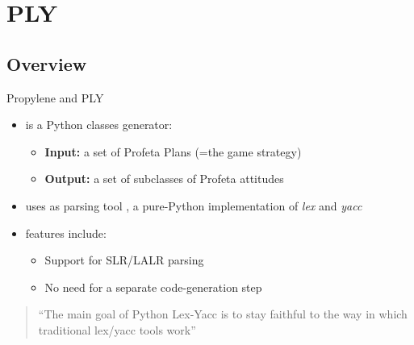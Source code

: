 \section{PLY}

\subsection{Overview}
\begin{frame}{Propylene and PLY}  
  \begin{itemize}
    \item {} is a Python classes generator:
\n
    \begin{itemize}
      \item \textbf{Input:} a set of Profeta Plans (=the game strategy)
\n  
      \item \textbf{Output:} a set of subclasses of Profeta attitudes 
    \end{itemize}
\N
    \item {} uses as parsing tool , a pure-Python
    implementation of \emph{lex} and \emph{yacc}
    \item
\N\n
     features include:
    \begin{itemize}
      \item Support for SLR/LALR parsing
      \item No need for a separate code-generation step
    \end{itemize}
  \end{itemize}
  \begin{quote}
    \begin{center}
      ``The main goal of Python Lex-Yacc is to stay faithful to the way in 
      which traditional lex/yacc tools work''
    \end{center}
  \end{quote}
%
\N\N
\end{frame}


